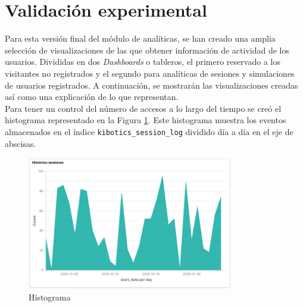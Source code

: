 \documentclass[a4paper, 12pt]{book}
\begin{document}
	\section{Validación experimental} 
	\label{sec:2_validacion_experimental} 


		Para esta versión final del módulo de analíticas, se han creado una amplia selección de visualizaciones de las que obtener información de actividad de los usuarios. Divididas en dos \textit{Dashboards} o tableros, el primero reservado a los visitantes no registrados y el segundo para analíticas de sesiones y simulaciones de usuarios registrados. A continuación, se mostrarán las visualizaciones creadas así como una explicación de lo que representan.\\
		
		Para tener un control del número de accesos a lo largo del tiempo se creó el histograma representado en la Figura \ref{fig:kibana_histogram}. Este histograma muestra los eventos almacenados en el índice \texttt{kibotics\_session\_log} dividido día a día en el eje de abscisas.	
		\begin{figure}[H]
			\centering
			\includegraphics[width=9cm, keepaspectratio]{img/kibana_01_histogram}
			\caption{Histograma}
			\label{fig:kibana_histogram}
		\end{figure}
		
\end{document}
